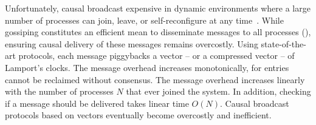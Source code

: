 
Unfortunately, causal broadcast  expensive in dynamic
environments where a large number of processes can join, leave, or
self-reconfigure at any time~\cite{charronbost1991concerning}. While gossiping
constitutes an efficient mean to disseminate messages to all processes (\REF),
ensuring causal delivery of these messages remains overcostly.  Using
state-of-the-art protocols, each message piggybacks a vector -- or a compressed
vector -- of Lamport's clocks.  The message overhead increases monotonically,
for entries cannot be reclaimed without consensus. The message overhead
increases linearly with the number of processes $N$ that ever joined the system.
In addition, checking if a message should be delivered takes linear time
$O(N)$. Causal broadcast protocols based on vectors eventually become overcostly
and inefficient.


